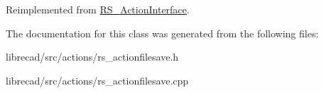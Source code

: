 Reimplemented from \hyperlink{classRS__ActionInterface_aa2ba8f6f697f735eace4ec5449c0b8cd}{R\-S\-\_\-\-Action\-Interface}.



The documentation for this class was generated from the following files\-:\begin{DoxyCompactItemize}
\item 
librecad/src/actions/rs\-\_\-actionfilesave.\-h\item 
librecad/src/actions/rs\-\_\-actionfilesave.\-cpp\end{DoxyCompactItemize}
